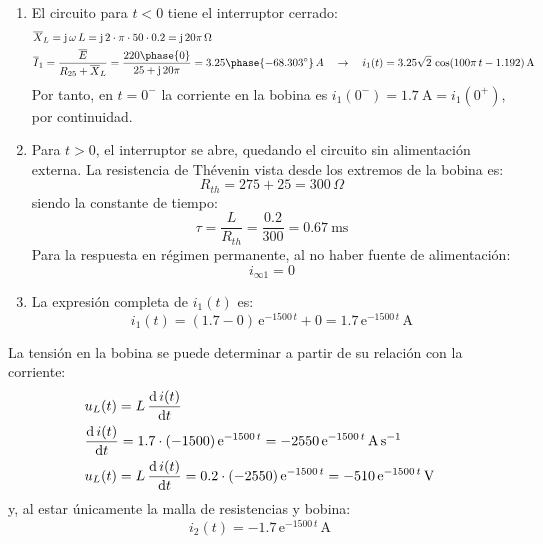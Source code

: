 \begin{enumerate}
    \item El circuito para $t<0$ tiene el interruptor cerrado:
    \begin{align*}
        &\overline{X}_L=\mathrm{j}\,\omega\,L=\mathrm{j}\,2\cdot\pi\cdot 50\cdot 0.2=\mathrm{j}\,20\pi\,\Omega\\
        &\overline{I}_1=\dfrac{\overline{E}}{R_{25}+\overline{X}_L}=\dfrac{220\phase{0}}{25+\mathrm{j}\,20\pi}=3.25\phase{-68.303^\circ}\,A \quad\rightarrow\quad i_1(t)=3.25\sqrt{2}\,\cos(100\pi\,t-1.192)\,\si{\ampere}
    \end{align*}
    Por tanto, en $t=0^-$ la corriente en la bobina es $i_1(0^-)=\qty{1.7}{\ampere}=i_1(0^+)$, por continuidad.
    \item Para $t>0$, el interruptor se abre, quedando el circuito sin alimentación externa. La resistencia de Thévenin vista desde los extremos de la bobina es:
    \begin{equation*}
        R_{th}=275+25=300\,\Omega
    \end{equation*}
    siendo la constante de tiempo:
    \begin{equation*}
      \tau=\dfrac{L}{R_{th}}=\dfrac{0.2}{300}=\qty{0.67}{\milli\second}
    \end{equation*}
    Para la respuesta en régimen permanente, al no haber fuente de alimentación:
    \begin{equation*}
        i_{\infty1}=0
    \end{equation*}
    \item La expresión completa de $i_1(t)$ es:
    \begin{equation*}
        i_1(t)=\left(1.7-0 \right)\,\mathrm{e}^{-1500\,t}+0=1.7\,\mathrm{e}^{-1500\,t}\,\si{\ampere}
    \end{equation*}
\end{enumerate}
La tensión en la bobina se puede determinar a partir de su relación con la corriente:
\begin{align*}
    &u_L(t)=L\,\diff{\,i(t)}{t}\\
    &\diff{\,i(t)}{t}=1.7\cdot (-1500)\,\mathrm{e}^{-1500\,t}=-2550\,\mathrm{e}^{-1500\,t}\,\si{\ampere\per\second}\\
    & u_L(t)=L\,\diff{\,i(t)}{t}=0.2\cdot (-2550)\,\mathrm{e}^{-1500\,t}=-510\,\mathrm{e}^{-1500\,t}\,\si{\volt}
\end{align*}
y, al estar únicamente la malla de resistencias y bobina:
\begin{equation*}
    i_2(t)=-1.7\,\mathrm{e}^{-1500\,t}\,\si{\ampere}
\end{equation*}


